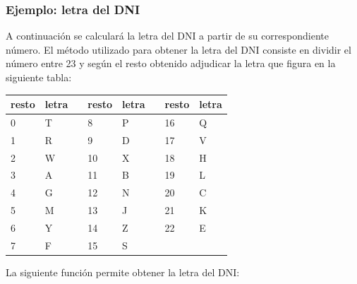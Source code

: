 \documentclass[]{book}
\newenvironment{Shaded}{\begin{snugshade}}{\end{snugshade}}
\newcommand{\ControlFlowTok}[1]{\textcolor[rgb]{0.13,0.29,0.53}{\textbf{#1}}}
\newcommand{\DecValTok}[1]{\textcolor[rgb]{0.00,0.00,0.81}{#1}}
\newcommand{\KeywordTok}[1]{\textcolor[rgb]{0.13,0.29,0.53}{\textbf{#1}}}
\newcommand{\NormalTok}[1]{#1}
\newcommand{\OperatorTok}[1]{\textcolor[rgb]{0.81,0.36,0.00}{\textbf{#1}}}
\newcommand{\StringTok}[1]{\textcolor[rgb]{0.31,0.60,0.02}{#1}}
\begin{document}
\hypertarget{ejemplo-letra-del-dni}{%
\subsubsection{Ejemplo: letra del DNI}\label{ejemplo-letra-del-dni}}

A continuación se
calculará la letra del DNI a partir de su correspondiente número. El
método utilizado para obtener la letra del DNI consiste en dividir el
número entre 23 y según el resto obtenido adjudicar la letra que figura
en la siguiente tabla:

\begin{longtable}[]{@{}llllllll@{}}
\toprule
resto & letra & & resto & letra & & resto & letra\tabularnewline
\midrule
\endhead
0 & T & & 8 & P & & 16 & Q\tabularnewline
1 & R & & 9 & D & & 17 & V\tabularnewline
2 & W & & 10 & X & & 18 & H\tabularnewline
3 & A & & 11 & B & & 19 & L\tabularnewline
4 & G & & 12 & N & & 20 & C\tabularnewline
5 & M & & 13 & J & & 21 & K\tabularnewline
6 & Y & & 14 & Z & & 22 & E\tabularnewline
7 & F & & 15 & S & & &\tabularnewline
\bottomrule
\end{longtable}

La siguiente función permite obtener la letra del DNI:

\begin{Shaded}
\end{Shaded}
\end{document}
